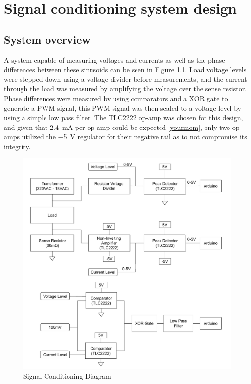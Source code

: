 \chapter{Signal conditioning system design}
\section{System overview} \label{sec:system}

A system capable of measuring voltages and currents as well as the phase differences between these sinusoids can be seen in Figure \ref{fig:system_diagram}. Load voltage levels were stepped down using a voltage divider before measurements, and the current through the load was measured by amplifying the voltage over the sense resistor. Phase differences were measured by using comparators and a XOR gate to generate a PWM signal, this PWM signal was then scaled to a voltage level by using a simple low pass filter. The TLC2222 op-amp was chosen for this design, and given that \SI{2.4}{mA} per op-amp could be expected \ref{yourmom}, only two op-amps utilized the \SI{-5}{V} regulator for their negative rail as to not compromise its integrity.

\begin{figure}
    \centering
    \includegraphics[width = 0.45\linewidth]{Figures/measurement_diagram.pdf}
    \caption{Signal Conditioning Diagram}
    \label{fig:system_diagram}
\end{figure}









